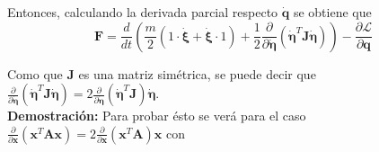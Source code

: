 \documentclass[twoside,11pt]{book}
\begin{document}
Entonces, calculando la derivada parcial respecto $\pmb{\dot{q}}$ se obtiene que 
\begin{equation}
\pmb{F}=\frac{d}{dt}\left(\frac{m}{2}(1\cdot \pmb{ \dot{\xi}}+\pmb{\dot{\xi}}\cdot 1)+\frac{1}{2}\frac{\partial}{\partial \pmb{\dot{\eta}}}(\pmb{\dot{\eta}}^{T}\pmb{J}\pmb{\dot{\eta}})\right)-\frac{\partial \mathcal{L}}{\partial \pmb{q}}
\end{equation}

Como que $\pmb{J}$ es una matriz simétrica, se puede decir que  $\frac{\partial}{\partial \pmb{\dot{\eta}}}(\pmb{\dot{\eta}}^{T}\pmb{J}\pmb{\dot{\eta}})=2 \frac{\partial}{\partial \pmb{\dot{\eta}}}(\pmb{\dot{\eta}}^{T}\pmb{J})\pmb{\dot{\eta}} $. \\

\textbf{Demostración:} Para probar ésto se verá para el caso $\frac{\partial}{\partial \pmb{x}}(\pmb{x}^{T}\pmb{A}\pmb{x})=2 \frac{\partial}{\partial \pmb{x}}(\pmb{x}^{T}\pmb{A})\pmb{x} $ con 
\end{document}
